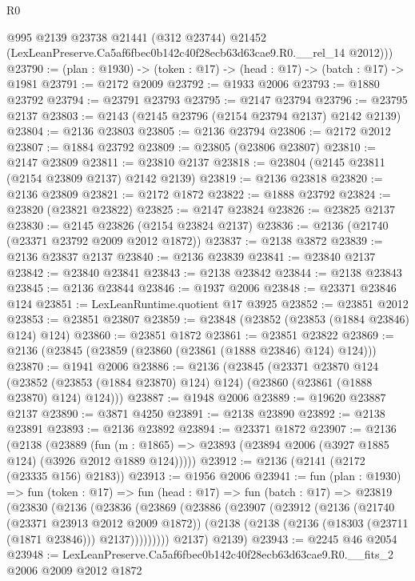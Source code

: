 \begin{lexlean}{R0}
\begin{coremodule}
        @995
        @2139
        @23738
        @21441
        (@312 @23744)
        @21452
        (LexLeanPreserve.Ca5af6fbec0b142c40f28ecb63d63cae9.R0.__rel_14 @2012)))
@23790 := (plan : @1930) -> (token : @17) -> (head : @17) -> (batch : @17) -> @1981
@23791 := @2172 @2009
@23792 := @1933 @2006
@23793 := @1880 @23792
@23794 := @23791 @23793
@23795 := @2147 @23794
@23796 := @23795 @2137
@23803 := @2143 (@2145 @23796 (@2154 @23794 @2137) @2142 @2139)
@23804 := @2136 @23803
@23805 := @2136 @23794
@23806 := @2172 @2012
@23807 := @1884 @23792
@23809 := @23805 (@23806 @23807)
@23810 := @2147 @23809
@23811 := @23810 @2137
@23818 := @23804 (@2145 @23811 (@2154 @23809 @2137) @2142 @2139)
@23819 := @2136 @23818
@23820 := @2136 @23809
@23821 := @2172 @1872
@23822 := @1888 @23792
@23824 := @23820 (@23821 @23822)
@23825 := @2147 @23824
@23826 := @23825 @2137
@23830 := @2145 @23826 (@2154 @23824 @2137)
@23836 := @2136 (@21740 (@23371 @23792 @2009 @2012 @1872))
@23837 := @2138 @3872
@23839 := @2136 @23837 @2137
@23840 := @2136 @23839
@23841 := @23840 @2137
@23842 := @23840 @23841
@23843 := @2138 @23842
@23844 := @2138 @23843
@23845 := @2136 @23844
@23846 := @1937 @2006
@23848 := @23371 @23846 @124
@23851 := LexLeanRuntime.quotient @17 @3925
@23852 := @23851 @2012
@23853 := @23851 @23807
@23859 := @23848 (@23852 (@23853 (@1884 @23846) @124) @124)
@23860 := @23851 @1872
@23861 := @23851 @23822
@23869 := @2136 (@23845 (@23859 (@23860 (@23861 (@1888 @23846) @124) @124)))
@23870 := @1941 @2006
@23886 := @2136
    (@23845
      (@23371
        @23870
        @124
        (@23852 (@23853 (@1884 @23870) @124) @124)
        (@23860 (@23861 (@1888 @23870) @124) @124)))
@23887 := @1948 @2006
@23889 := @19620 @23887 @2137
@23890 := @3871 @4250
@23891 := @2138 @23890
@23892 := @2138 @23891
@23893 := @2136 @23892
@23894 := @23371 @1872
@23907 := @2136
    (@2138
      (@23889
        (fun (m : @1865) => @23893 (@23894 @2006 (@3927 @1885 @124) (@3926 @2012 @1889 @124)))))
@23912 := @2136 (@2141 (@2172 (@23335 @156) @2183))
@23913 := @1956 @2006
@23941 := fun (plan : @1930) =>
  fun (token : @17) =>
  fun (head : @17) =>
  fun (batch : @17) =>
  @23819
    (@23830
      (@2136
        (@23836
          (@23869
            (@23886
              (@23907
                (@23912
                  (@2136
                    (@21740 (@23371 @23913 @2012 @2009 @1872))
                    (@2138 (@2138 (@2136 (@18303 (@23711 (@1871 @23846))) @2137)))))))))
        @2137)
      @2139)
@23943 := @2245 @46 @2054
@23948 := LexLeanPreserve.Ca5af6fbec0b142c40f28ecb63d63cae9.R0.__fits_2 @2006 @2009 @2012 @1872

\end{coremodule}
\end{lexlean}
